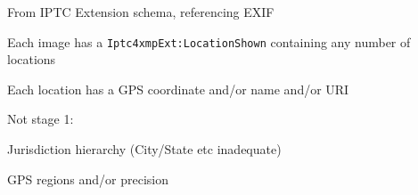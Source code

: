 \documentclass{article}
\newenvironment{slide*}[1][]{
	\def\inset{\leftmargin=0.5ex}
	\clearpage
	\ifthenelse{\isempty{#1}}{}{\vspace*{-0.75in}\begin{center}\raggedright{\bf #1\textcolor{none}{j}\hrule}\vspace{0.5ex}\end{center}}
	\def\nest{\begin{list}{$^{_\bullet}$ }{\inset\def\inset{\leftmargin=1.5ex}\itemindent=0ex}}
	\def\unnest{\end{list}}
}{
}
\newenvironment{slide}[1][]{
	\begin{slide*}[#1]\nest
}{
	\unnest\end{slide*}
}
\newlength\nsbase
\def\small{\fontsize{0.8333\nsbase}{\nsbase}\selectfont}
\def\scriptsize{\fontsize{0.6944\nsbase}{0.8333\nsbase}\selectfont}
\begin{document}
\begin{slide}[Location]
\item From IPTC Extension schema, referencing EXIF
\item Each image has a {\scriptsize \tt Iptc4xmpExt:LocationShown} containing any number of locations
\item Each location has a GPS coordinate and/or name and/or URI
\item Not stage 1:
    \nest
    \item Jurisdiction hierarchy (City/State etc inadequate)
    \item GPS regions and/or precision
    \unnest
\end{slide}
\end{document}
